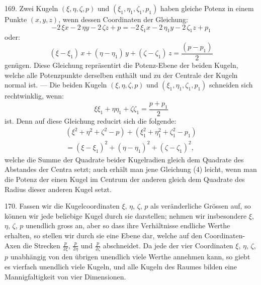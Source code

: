 169. Zwei Kugeln $(\xi, \eta, \zeta, p)$ und $(\xi_1, \eta_1, \zeta_1, p_1)$ haben
gleiche Potenz in einem Punkte $(x, y, z)$, wenn dessen Coordinaten
der Gleichung:
\[
-2\,\xi x - 2\,\eta y - 2\,\zeta z + p = -2\,\xi_1 x - 2\,\eta_1 y - 2\,\zeta_1 z + p_1
\]
oder:
\[
(\xi-\xi_1)\,x + (\eta-\eta_1)\,y + (\zeta-\zeta_1)\,z = \frac{(p-p_1)}{2}
\]
gen\"ugen. Diese Gleichung repr\"asentirt die Potenz-Ebene der
beiden Kugeln, welche alle Potenzpunkte derselben enth\"alt
und zu der Centrale der Kugeln normal ist. --- Die beiden
Kugeln $(\xi, \eta, \zeta, p)$ und $(\xi_1, \eta_1, \zeta_1, p_1)$ schneiden sich rechtwinklig,
wenn:
\[
\tag*{(4)}
\xi\xi_1 + \eta\eta_1 + \zeta\zeta_1 = \frac{p+p_1}{2}
\]
ist. Denn auf diese Gleichung reducirt sich die folgende:
\begin{gather*}
(\xi^2 + \eta^2 + \zeta^2 - p) + (\xi_1^2 + \eta_1^2 + \zeta_1^2 - p_1)
\\
= (\xi-\xi_1)^2 + (\eta-\eta_1)^2 + (\zeta-\zeta_1)^2,
\end{gather*}
welche die Summe der Quadrate beider Kugelradien gleich
dem Quadrate des Abstandes der Centra setzt; auch erh\"alt
man jene Gleichung (4) leicht, wenn man die Potenz der einen
Kugel im Centrum der anderen gleich dem Quadrate des
Radius dieser anderen Kugel setzt.

170. Fassen wir die Kugelcoordinaten $\xi$, $\eta$, $\zeta$, $p$ als
ver\"anderliche Gr\"ossen auf, so k\"onnen wir jede beliebige Kugel
durch sie darstellen; nehmen wir insbesondere $\xi$, $\eta$, $\zeta$, $p$ unendlich
gross an, aber so dass ihre Verh\"altnisse endliche
Werthe erhalten, so stellen wir durch sie eine Ebene dar,
welche auf den Coordinaten-Axen die Strecken $\frac{p}{2\xi}$, $\frac{p}{2\eta}$ und $\frac{p}{2\zeta}$
abschneidet. Da jede der vier Coordinaten $\xi$, $\eta$, $\zeta$, $p$ unabh\"angig
von den \"ubrigen unendlich viele Werthe annehmen kann,
so giebt es vierfach unendlich viele Kugeln, und alle Kugeln
des Raumes bilden eine Mannigfaltigkeit von vier Dimensionen.

